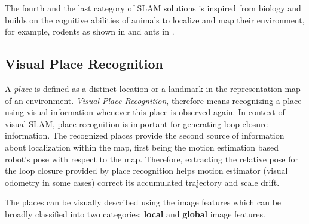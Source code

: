\documentclass{article}
\begin{document}
The fourth and the last category of SLAM solutions is inspired from biology \cite{milford2008robot} and builds on the cognitive abilities of animals to localize and map their environment, for example, rodents as shown in \cite{Milford2004} and ants in \cite{Collett2010}.

\subsection{Visual Place Recognition}
A \emph{place} is defined as a distinct location or a landmark in the representation map of an environment. \emph{Visual Place Recognition}, therefore means recognizing a place using visual information whenever this place is observed again. In context of visual SLAM, place recognition is important for generating loop closure information. The recognized places provide the second source of information about localization within the map, first being the motion estimation based robot's pose with respect to the map. Therefore, extracting the relative pose for the loop closure provided by place recognition helps motion estimator (visual odometry in some cases) correct its accumulated trajectory and scale drift. 

The places can be visually described using the image features which can be broadly classified into two categories: \textbf{local} and \textbf{global} image features.
\end{document}
